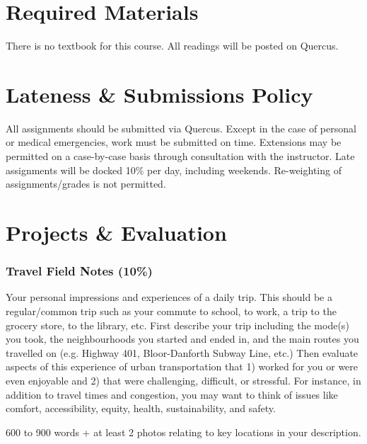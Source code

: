 \documentclass[11pt]{article}
\begin{document}
	
	
	\section*{Required Materials}
	
	There is no textbook for this course. All readings will be posted on Quercus.
	

	
	\section*{Lateness \& Submissions Policy}
	
	All assignments should be submitted via Quercus. Except in the case of personal or medical emergencies, work must be submitted on time. Extensions may be permitted on a case-by-case basis through consultation with the instructor. Late assignments will be docked 10\% per day, including weekends. Re-weighting of assignments/grades is not permitted.
	
	
	
	
		
	

	\section*{Projects \& Evaluation}
	
	
	\subsubsection*{Travel Field Notes (10\%)}
	
	Your personal impressions and experiences of a daily trip. This should be a regular/common trip such as your commute to school, to work, a trip to the grocery store, to the library, etc. First describe your trip including the mode(s) you took, the neighbourhoods you started and ended in, and the main routes you travelled on (e.g. Highway 401, Bloor-Danforth Subway Line, etc.)
	Then evaluate aspects of this experience of urban transportation that 1) worked for you or were even enjoyable and 2) that were challenging, difficult, or stressful. For instance, in addition to travel times and congestion, you may want to think of issues like comfort, accessibility, equity, health, sustainability, and safety.	
	
	600 to 900 words + at least 2 photos relating to key locations in your description.
	
\end{document}
